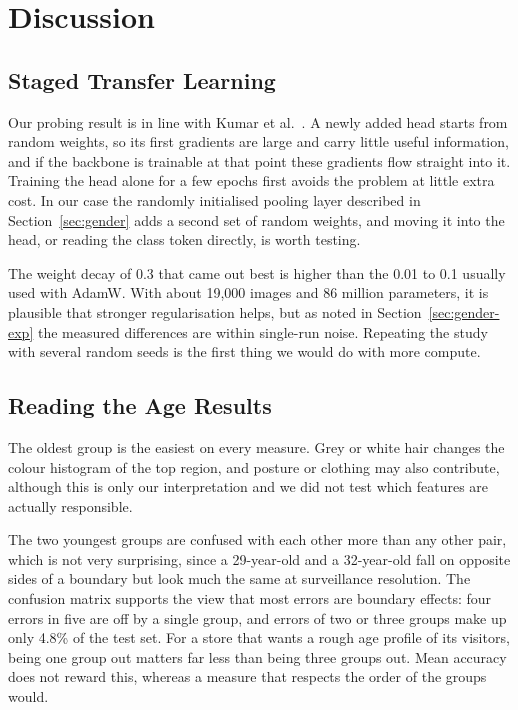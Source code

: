 \documentclass[conference]{IEEEtran}
\begin{document}
\section{Discussion}
\label{sec:discussion}

\subsection{Staged Transfer Learning}
Our probing result is in line with Kumar et al.~\cite{kumar2022finetuning}. A newly
added head starts from random weights, so its first gradients are large and carry
little useful information, and if the backbone is trainable at that point these
gradients flow straight into it. Training the head alone for a few epochs first
avoids the problem at little extra cost. In our case the randomly initialised
pooling layer described in Section~\ref{sec:gender} adds a second set of random
weights, and moving it into the head, or reading the class token directly, is
worth testing.

The weight decay of 0.3 that came out best is higher than the 0.01 to 0.1 usually
used with AdamW. With about 19,000 images and 86 million parameters, it is
plausible that stronger regularisation helps, but as noted in
Section~\ref{sec:gender-exp} the measured differences are within single-run noise.
Repeating the study with several random seeds is the first thing we would do with
more compute.

\subsection{Reading the Age Results}
The oldest group is the easiest on every measure. Grey or white hair changes the
colour histogram of the top region, and posture or clothing may also contribute,
although this is only our interpretation and we did not test which features are
actually responsible.

The two youngest groups are confused with each other more than any other pair,
which is not very surprising, since a 29-year-old and a 32-year-old fall on
opposite sides of a boundary but look much the same at surveillance resolution.
The confusion matrix supports the view that most errors are boundary effects: four
errors in five are off by a single group, and errors of two or three groups make up
only 4.8\% of the test set. For a store that wants a rough age profile of its
visitors, being one group out matters far less than being three groups out. Mean
accuracy does not reward this, whereas a measure that respects the order of the
groups would.
\end{document}
